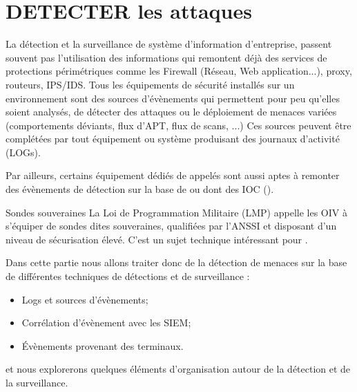 

\section{DETECTER les attaques}

La détection et la surveillance de système d'information d'entreprise, passent souvent pas l'utilisation des informations qui remontent déjà des services de protections périmétriques comme les Firewall (Réseau, Web application...),  proxy,  routeurs, IPS/IDS. Tous les équipements de sécurité installés sur un environnement sont des sources d'évènements qui permettent pour peu qu'elles soient analysés, de détecter des attaques ou le déploiement de menaces variées (comportements déviants, flux d'APT, flux de scans, ...)
Ces sources peuvent être complétées par tout équipement ou système  produisant des journaux d'activité (LOGs).

Par ailleurs, certains équipement dédiés de  appelés  sont aussi aptes à remonter des évènements de détection sur la base de  ou  dont des IOC ().

\begin{techworkbox}{Sondes souveraines}
La Loi de Programmation Militaire (LMP) appelle les OIV à s’équiper de sondes dites souveraines, qualifiées par l’ANSSI et  disposant d’un niveau de sécurisation élevé. C'est un sujet technique intéressant pour  \fichetech. 
\end{techworkbox}

Dans cette partie nous allons traiter donc de la détection de menaces sur la base  de différentes techniques de détections et de surveillance :

\begin{itemize}
  \item Logs et sources d'évènements; 
  \item Corrélation d'évènement avec les SIEM;
  \item Évènements provenant des terminaux.
\end{itemize}

et nous explorerons quelques éléments d'organisation autour de la détection et de la surveillance.

